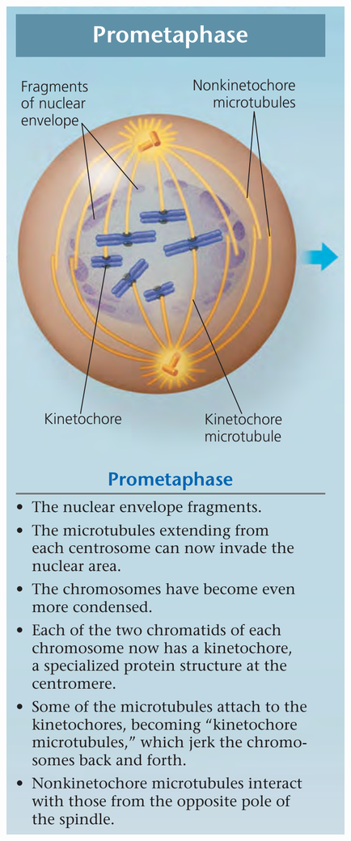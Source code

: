 \documentclass[11pt,ignorenonframetext,aspectratio=169]{beamer}
\begin{document}
\begin{frame}{}
\begin{columns}[T,onlytextwidth]
\begin{center}\includegraphics[width=0.6\linewidth]{../images/mitosis_animal_cell23} \end{center}
  
\end{columns}
\end{frame}
\end{document}
